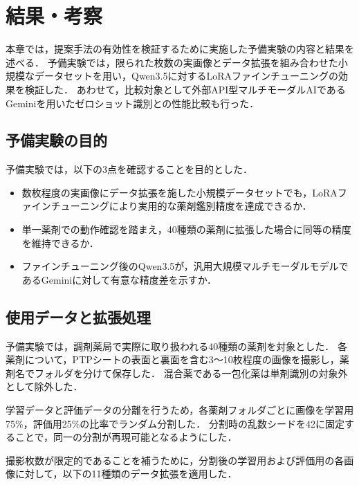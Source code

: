 \documentclass{jsarticle}
\begin{document}
\newpage

\section{結果・考察}\label{sec4}

本章では，提案手法の有効性を検証するために実施した予備実験の内容と結果を述べる．
予備実験では，限られた枚数の実画像とデータ拡張を組み合わせた小規模なデータセットを用い，Qwen3.5に対するLoRAファインチューニングの効果を検証した．
あわせて，比較対象として外部API型マルチモーダルAIであるGeminiを用いたゼロショット識別との性能比較も行った．

\subsection{予備実験の目的}

予備実験では，以下の3点を確認することを目的とした．

\begin{itemize}
  \item 数枚程度の実画像にデータ拡張を施した小規模データセットでも，LoRAファインチューニングにより実用的な薬剤鑑別精度を達成できるか．
  \item 単一薬剤での動作確認を踏まえ，40種類の薬剤に拡張した場合に同等の精度を維持できるか．
  \item ファインチューニング後のQwen3.5が，汎用大規模マルチモーダルモデルであるGeminiに対して有意な精度差を示すか．
\end{itemize}

\subsection{使用データと拡張処理}

予備実験では，調剤薬局で実際に取り扱われる40種類の薬剤を対象とした．
各薬剤について，PTPシートの表面と裏面を含む3〜10枚程度の画像を撮影し，薬剤名でフォルダを分けて保存した．
混合薬である一包化薬は単剤識別の対象外として除外した．

学習データと評価データの分離を行うため，各薬剤フォルダごとに画像を学習用75\%，評価用25\%の比率でランダム分割した．
分割時の乱数シードを42に固定することで，同一の分割が再現可能となるようにした．

撮影枚数が限定的であることを補うために，分割後の学習用および評価用の各画像に対して，以下の11種類のデータ拡張を適用した．
\end{document}
